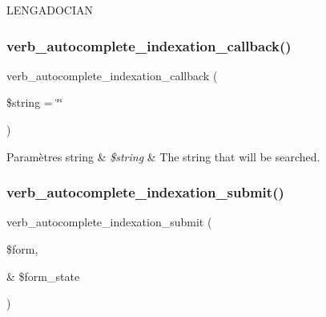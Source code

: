 L\+E\+N\+G\+A\+D\+O\+C\+I\+AN \hypertarget{php_2conjoc__lengadocian__web_form_8inc_a378d4601a46c698692d26cb301470598}{}\label{php_2conjoc__lengadocian__web_form_8inc_a378d4601a46c698692d26cb301470598} 
\subsubsection{\texorpdfstring{verb\+\_\+autocomplete\+\_\+indexation\+\_\+callback()}{verb\_autocomplete\_indexation\_callback()}}
{\footnotesize\ttfamily verb\+\_\+autocomplete\+\_\+indexation\+\_\+callback (\begin{DoxyParamCaption}\item[{}]{\$string = {\ttfamily \char`\"{}\char`\"{}} }\end{DoxyParamCaption})}


\begin{DoxyParams}[1]{Paramètres}
string & {\em \$string} & The string that will be searched. \\
\hline
\end{DoxyParams}
\hypertarget{php_2conjoc__lengadocian__web_form_8inc_a5e7b0be9cab73b5b2be66499afd0edc5}{}\label{php_2conjoc__lengadocian__web_form_8inc_a5e7b0be9cab73b5b2be66499afd0edc5} 
\subsubsection{\texorpdfstring{verb\+\_\+autocomplete\+\_\+indexation\+\_\+submit()}{verb\_autocomplete\_indexation\_submit()}}
{\footnotesize\ttfamily verb\+\_\+autocomplete\+\_\+indexation\+\_\+submit (\begin{DoxyParamCaption}\item[{}]{\$form,  }\item[{\&}]{\$form\+\_\+state }\end{DoxyParamCaption})}

